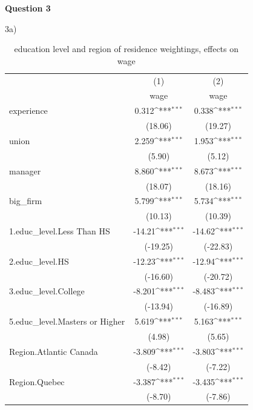 \documentclass[11pt]{article}
\begin{document}
\textbf{Question 3}

3a)

{
\begin{table}[!ht]
\caption{education level and region of residence weightings, effects on wage}
\centering
\def\sym#1{\ifmmode^{#1}\else\(^{#1}\)\fi}
\begin{tabular}{l*{2}{c}}
\hline\hline
            &\multicolumn{1}{c}{(1)}&\multicolumn{1}{c}{(2)}\\
            &\multicolumn{1}{c}{wage}&\multicolumn{1}{c}{wage}\\
\hline
experience  &       0.312\sym{***}&       0.338\sym{***}\\
            &     (18.06)         &     (19.27)         \\
[1em]
union       &       2.259\sym{***}&       1.953\sym{***}\\
            &      (5.90)         &      (5.12)         \\
[1em]
manager     &       8.860\sym{***}&       8.673\sym{***}\\
            &     (18.07)         &     (18.16)         \\
[1em]
big\_firm    &       5.799\sym{***}&       5.734\sym{***}\\
            &     (10.13)         &     (10.39)         \\
[1em]
1.educ\_level.Less Than HS&      -14.21\sym{***}&      -14.62\sym{***}\\
            &    (-19.25)         &    (-22.83)         \\
[1em]
2.educ\_level.HS&      -12.23\sym{***}&      -12.94\sym{***}\\
            &    (-16.60)         &    (-20.72)         \\
[1em]
3.educ\_level.College&      -8.201\sym{***}&      -8.483\sym{***}\\
            &    (-13.94)         &    (-16.89)         \\
[1em]
5.educ\_level.Masters or Higher&       5.619\sym{***}&       5.163\sym{***}\\
            &      (4.98)         &      (5.65)         \\
[1em]
Region.Atlantic Canada    &      -3.809\sym{***}&      -3.803\sym{***}\\
            &     (-8.42)         &     (-7.22)         \\
[1em]
Region.Quebec    &      -3.387\sym{***}&      -3.435\sym{***}\\
            &     (-8.70)         &     (-7.86)         \\

\end{tabular}
\end{table}}
\end{document}
